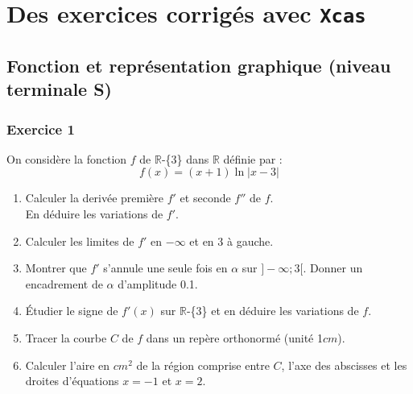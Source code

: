\documentclass{article}
\begin{document}
\pagebreak

\section{Des exercices corrig\'es avec {\tt Xcas}}

\subsection{Fonction et repr\'esentation graphique (niveau terminale S)}

\subsubsection{Exercice 1}
On consid\`ere la fonction $f$ de $\mathbb R$-\{3\} dans $\mathbb R$ 
d\'efinie par :
$$f(x)=(x+1)\ln|x-3|$$
\begin{enumerate}
\item Calculer la deriv\'ee premi\`ere $f'$ et seconde $f''$ de $f$.\\
En d\'eduire les variations de $f'$.
\item Calculer les limites de $f'$ en $-\infty$ et en 3 \`a gauche.
\item Montrer que $f'$ s'annule une seule fois en $\alpha$ sur $]-\infty;3[$.
Donner un encadrement de $\alpha$ d'amplitude 0.1.
\item  \'Etudier le signe de $f'(x)$ sur $\mathbb R$-\{3\} et en d\'eduire les 
variations de $f$.
\item  Tracer la courbe $C$ de $f$ dans un rep\`ere orthonorm\'e (unit\'e 1$cm$).
\item  Calculer l'aire en $cm^2$ de la r\'egion comprise entre $C$, l'axe des
 abscisses et les droites d'\'equations $x=-1$ et $x=2$.
\end{enumerate}
\end{document}
